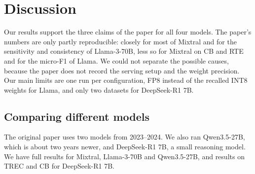 \section{Discussion}

Our results support the three claims of the paper for all four models. The
paper's numbers are only partly reproducible: closely for most of Mixtral and
for the sensitivity and consistency of Llama-3-70B, less so for Mixtral on CB
and RTE and for the micro-F1 of Llama. We could not separate the possible
causes, because the paper does not record the serving setup and the weight
precision. Our main limits are one run per configuration, FP8 instead of the
recalled INT8 weights for Llama, and only two datasets for DeepSeek-R1 7B.

\subsection{Comparing different models}
\label{sec:disc-models}

The original paper uses two models from 2023--2024. We also ran Qwen3.5-27B,
which is about two years newer, and DeepSeek-R1 7B, a small reasoning model.
We have full results for Mixtral, Llama-3-70B and Qwen3.5-27B, and results
on TREC and CB for DeepSeek-R1 7B.

